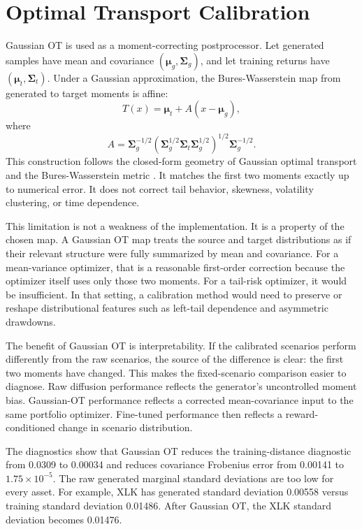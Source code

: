 \documentclass{article}
\newcommand{\bmu}{\boldsymbol{\mu}}
\newcommand{\bSigma}{\boldsymbol{\Sigma}}
\begin{document}
\section{Optimal Transport Calibration}

Gaussian OT is used as a moment-correcting postprocessor. Let generated samples
have mean and covariance $(\bmu_g,\bSigma_g)$, and let training returns have
$(\bmu_t,\bSigma_t)$. Under a Gaussian approximation, the Bures-Wasserstein map
from generated to target moments is affine:
\begin{equation}
  T(x)=\bmu_t + A(x-\bmu_g),
\end{equation}
where
\begin{equation}
  A = \bSigma_g^{-1/2}
      \left(
        \bSigma_g^{1/2}\bSigma_t\bSigma_g^{1/2}
      \right)^{1/2}
      \bSigma_g^{-1/2}.
\end{equation}
This construction follows the closed-form geometry of Gaussian optimal transport
and the Bures-Wasserstein metric \citep{bures1969,bhatia2019,peyre2019}. It
matches the first two moments exactly up to numerical error. It does not correct
tail behavior, skewness, volatility clustering, or time dependence.

This limitation is not a weakness of the implementation. It is a property of the
chosen map. A Gaussian OT map treats the source and target distributions as if
their relevant structure were fully summarized by mean and covariance. For a
mean-variance optimizer, that is a reasonable first-order correction because the
optimizer itself uses only those two moments. For a tail-risk optimizer, it would
be insufficient. In that setting, a calibration method would need to preserve or
reshape distributional features such as left-tail dependence and asymmetric
drawdowns.

The benefit of Gaussian OT is interpretability. If the calibrated scenarios
perform differently from the raw scenarios, the source of the difference is
clear: the first two moments have changed. This makes the fixed-scenario
comparison easier to diagnose. Raw diffusion performance reflects the generator's
uncontrolled moment bias. Gaussian-OT performance reflects a corrected
mean-covariance input to the same portfolio optimizer. Fine-tuned performance
then reflects a reward-conditioned change in scenario distribution.

The diagnostics show that Gaussian OT reduces the training-distance diagnostic
from 0.0309 to 0.00034 and reduces covariance Frobenius error from
0.00141 to $1.75\times10^{-5}$. The raw generated marginal standard deviations
are too low for every asset. For example, XLK has generated standard deviation
0.00558 versus training standard deviation 0.01486. After Gaussian OT, the XLK
standard deviation becomes 0.01476.
\end{document}
